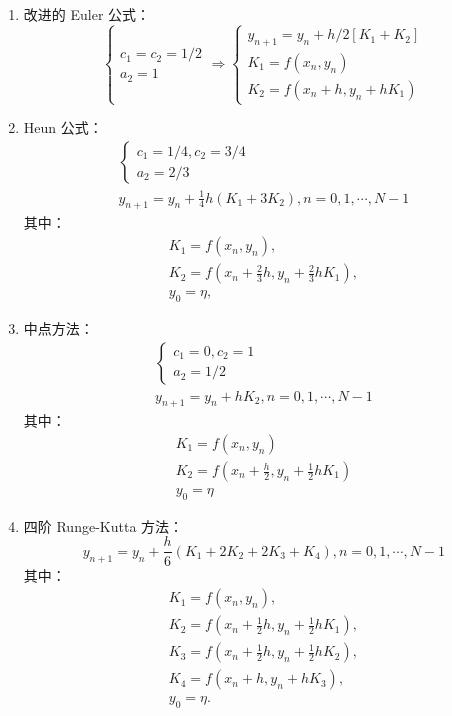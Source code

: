 \documentclass[UTF8,ctexart,a4paper,11pt,openany]{article}
\theoremstyle{definition}
\begin{document}
        \begin{enumerate}
            \item 改进的 Euler 公式：$$\left\{\begin{array}{l}c_{1}=c_{2}=1 / 2 \\ a_{2}=1\end{array} \Rightarrow\left\{\begin{array}{l}y_{n+1}=y_{n}+h / 2\left[K_{1}+K_{2}\right] \\ K_{1}=f\left(x_{n}, y_{n}\right) \\ K_{2}=f\left(x_{n}+h, y_{n}+h K_{1}\right)\end{array}\right.\right.$$
            
            \item Heun 公式：$$\begin{array}{l}\left\{\begin{array}{l}c_{1}=1 / 4, c_{2}=3 / 4 \\ a_{2}=2 / 3\end{array}\right. \\ y_{n+1}=y_{n}+\frac{1}{4} h\left(K_{1}+3 K_{2}\right), n=0,1, \cdots, N-1\end{array}$$其中：$$\begin{array}{l}K_{1}=f\left(x_{n}, y_{n}\right), \\ K_{2}=f\left(x_{n}+\frac{2}{3} h, y_{n}+\frac{2}{3} h K_{1}\right), \\ y_{0}=\eta,\end{array}$$
            
            \item 中点方法：$$\begin{array}{l}\left\{\begin{array}{l}c_{1}=0, c_{2}=1 \\ a_{2}=1 / 2\end{array}\right. \\ y_{n+1}=y_{n}+h K_{2}, n=0,1, \cdots, N-1\end{array}$$其中：$$\begin{array}{l}K_{1}=f\left(x_{n}, y_{n}\right) \\ K_{2}=f\left(x_{n}+\frac{h}{2}, y_{n}+\frac{1}{2} h K_{1}\right) \\ y_{0}=\eta\end{array}$$

            \item 四阶 Runge-Kutta 方法：$$y_{n+1}=y_{n}+\frac{h}{6}\left(K_{1}+2 K_{2}+2 K_{3}+K_{4}\right), n=0,1, \cdots, N-1$$其中：$$\begin{array}{l}K_{1}=f\left(x_{n}, y_{n}\right), \\ K_{2}=f\left(x_{n}+\frac{1}{2} h, y_{n}+\frac{1}{2} h K_{1}\right), \\ K_{3}=f\left(x_{n}+\frac{1}{2} h, y_{n}+\frac{1}{2} h K_{2}\right), \\ K_{4}=f\left(x_{n}+h, y_{n}+h K_{3}\right), \\ y_{0}=\eta .\end{array}$$
             
        \end{enumerate}
\end{document}
